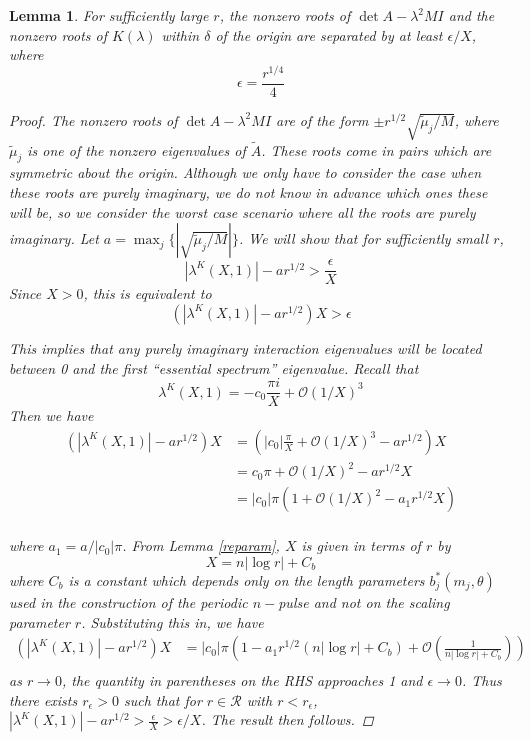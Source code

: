 \documentclass[12pt]{article}
\newtheorem{lemma}{Lemma}
\begin{document}
\begin{lemma}\label{epsilonballslemma}
For sufficiently large $r$, the nonzero roots of $\det A - \lambda^2 M I$ and the nonzero roots of $K(\lambda)$ within $\delta$ of the origin are separated by at least $\epsilon/X$, where
\begin{equation}\label{epsilonchoice}
\epsilon = \frac{r^{1/4}}{4}
\end{equation}
\begin{proof}
The nonzero roots of $\det A - \lambda^2 M I$ are of the form $\pm r^{1/2} \sqrt{\tilde{\mu}_j/M}$, where $\tilde{\mu}_j$ is one of the nonzero eigenvalues of $\tilde{A}$. These roots come in pairs which are symmetric about the origin. Although we only have to consider the case when these roots are purely imaginary, we do not know in advance which ones these will be, so we consider the worst case scenario where all the roots are purely imaginary. Let $a = \max_j\{| \sqrt{\tilde{\mu}_j/M}|\}$. We will show that for sufficiently small $r$, 
\[
|\lambda^K(X,1)| - a r^{1/2} > \frac{\epsilon}{X}
\]
Since $X > 0$, this is equivalent to
\[
(|\lambda^K(X,1)| - a r^{1/2})X  > \epsilon
\]

This implies that any purely imaginary interaction eigenvalues will be located between 0 and the first ``essential spectrum'' eigenvalue. Recall that 
\[
\lambda^K(X,1)
= -c_0 \frac{\pi i }{X} + \mathcal{O}(1/X)^3 
\]
Then we have
\begin{align*}
(|\lambda^K(X,1)| - a r^{1/2})X &= \left( |c_0| \frac{\pi}{X} + \mathcal{O}(1/X)^3 - a r^{1/2} \right)X \\
&= c_0 \pi + \mathcal{O}(1/X)^2 - a r^{1/2} X \\
&= |c_0| \pi \left(1 + \mathcal{O}(1/X)^2 - a_1 r^{1/2} X\right)  \\
\end{align*}

where $a_1 = a / |c_0| \pi$. From Lemma \ref{reparam}, $X$ is given in terms of $r$ by
\[
X = n |\log r| + C_b
\]
where $C_b$ is a constant which depends only on the length parameters $b^*_j(m_j, \theta)$ used in the construction of the periodic $n-$pulse and not on the scaling parameter $r$. Substituting this in, we have
\begin{align*}
(|\lambda^K(X,1)| - a r^{1/2})X 
&= |c_0| \pi \left(1 - a_1 r^{1/2}(n |\log r| + C_b) + \mathcal{O}\left( \frac{1}{n |\log r| + C_b} \right) \right)  \\
\end{align*}
as $r \rightarrow 0$, the quantity in parentheses on the RHS approaches 1 and $\epsilon \rightarrow 0$. Thus there exists $r_\epsilon > 0$ such that for $r \in \mathcal{R}$ with $r < r_\epsilon$, $|\lambda^K(X,1)| - a r^{1/2} > \frac{\epsilon}{X} > \epsilon/X$. The result then follows.
\end{proof}
\end{lemma}
\end{document}
